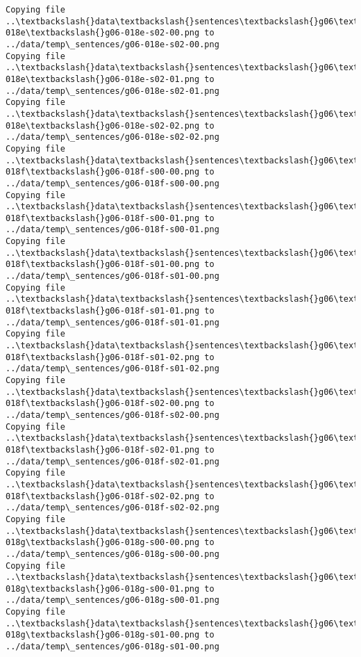 \documentclass[11pt]{article}
\begin{document}
\begin{Verbatim}[commandchars=\\\{\}]
Copying file ..\textbackslash{}data\textbackslash{}sentences\textbackslash{}g06\textbackslash{}g06-018e\textbackslash{}g06-018e-s02-00.png to
../data/temp\_sentences/g06-018e-s02-00.png
Copying file ..\textbackslash{}data\textbackslash{}sentences\textbackslash{}g06\textbackslash{}g06-018e\textbackslash{}g06-018e-s02-01.png to
../data/temp\_sentences/g06-018e-s02-01.png
Copying file ..\textbackslash{}data\textbackslash{}sentences\textbackslash{}g06\textbackslash{}g06-018e\textbackslash{}g06-018e-s02-02.png to
../data/temp\_sentences/g06-018e-s02-02.png
Copying file ..\textbackslash{}data\textbackslash{}sentences\textbackslash{}g06\textbackslash{}g06-018f\textbackslash{}g06-018f-s00-00.png to
../data/temp\_sentences/g06-018f-s00-00.png
Copying file ..\textbackslash{}data\textbackslash{}sentences\textbackslash{}g06\textbackslash{}g06-018f\textbackslash{}g06-018f-s00-01.png to
../data/temp\_sentences/g06-018f-s00-01.png
Copying file ..\textbackslash{}data\textbackslash{}sentences\textbackslash{}g06\textbackslash{}g06-018f\textbackslash{}g06-018f-s01-00.png to
../data/temp\_sentences/g06-018f-s01-00.png
Copying file ..\textbackslash{}data\textbackslash{}sentences\textbackslash{}g06\textbackslash{}g06-018f\textbackslash{}g06-018f-s01-01.png to
../data/temp\_sentences/g06-018f-s01-01.png
Copying file ..\textbackslash{}data\textbackslash{}sentences\textbackslash{}g06\textbackslash{}g06-018f\textbackslash{}g06-018f-s01-02.png to
../data/temp\_sentences/g06-018f-s01-02.png
Copying file ..\textbackslash{}data\textbackslash{}sentences\textbackslash{}g06\textbackslash{}g06-018f\textbackslash{}g06-018f-s02-00.png to
../data/temp\_sentences/g06-018f-s02-00.png
Copying file ..\textbackslash{}data\textbackslash{}sentences\textbackslash{}g06\textbackslash{}g06-018f\textbackslash{}g06-018f-s02-01.png to
../data/temp\_sentences/g06-018f-s02-01.png
Copying file ..\textbackslash{}data\textbackslash{}sentences\textbackslash{}g06\textbackslash{}g06-018f\textbackslash{}g06-018f-s02-02.png to
../data/temp\_sentences/g06-018f-s02-02.png
Copying file ..\textbackslash{}data\textbackslash{}sentences\textbackslash{}g06\textbackslash{}g06-018g\textbackslash{}g06-018g-s00-00.png to
../data/temp\_sentences/g06-018g-s00-00.png
Copying file ..\textbackslash{}data\textbackslash{}sentences\textbackslash{}g06\textbackslash{}g06-018g\textbackslash{}g06-018g-s00-01.png to
../data/temp\_sentences/g06-018g-s00-01.png
Copying file ..\textbackslash{}data\textbackslash{}sentences\textbackslash{}g06\textbackslash{}g06-018g\textbackslash{}g06-018g-s01-00.png to
../data/temp\_sentences/g06-018g-s01-00.png

\end{Verbatim}
\end{document}
